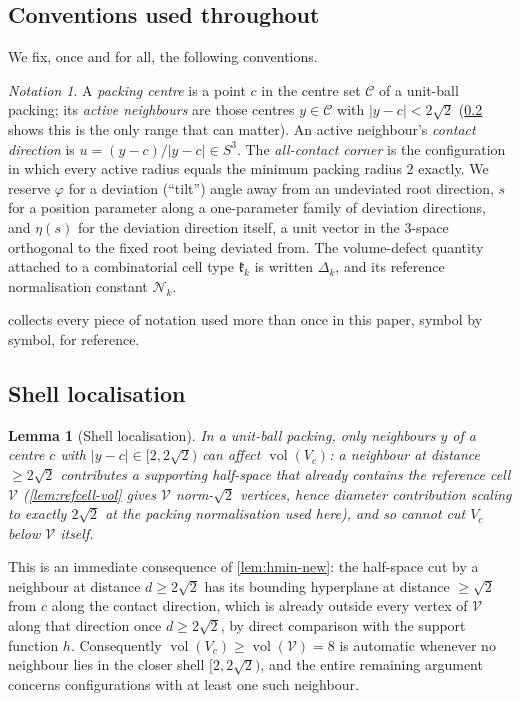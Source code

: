 \documentclass[11pt,reqno]{amsart}
\renewcommand{\_}{\origunderscore\allowbreak}
\numberwithin{equation}{section}
\theoremstyle{plain}
\newtheorem{lem}[thm]{Lemma}
\theoremstyle{definition}
\theoremstyle{remark}
\newtheorem{notation}[thm]{Notation}
\newcommand{\VCell}{\mathcal{V}}             %
\newcommand{\Cell}[1]{\mathfrak{k}_{#1}}     %
\newcommand{\tilt}{\varphi}                  %
\newcommand{\arcp}{s}                        %
\newcommand{\dev}{\eta}                      %
\newcommand{\defect}{\Delta}                 %
\newcommand{\norm}[1]{\mathcal{N}_{#1}}      %
\DeclareMathOperator{\vol}{vol}
\begin{document}
\subsection{Conventions used throughout}

We fix, once and for all, the following conventions.

\begin{notation}\label{not:conventions-new}
A \emph{packing centre} is a point $c$ in the centre set $\mathcal{C}$
of a unit-ball packing; its \emph{active neighbours} are those centres
$y\in\mathcal{C}$ with $|y-c|<2\sqrt2$ (\cref{sec:shell-new} shows this
is the only range that can matter). An active neighbour's \emph{contact
direction} is $u=(y-c)/|y-c|\in S^3$. The \emph{all-contact corner} is
the configuration in which every active radius equals the minimum
packing radius $2$ exactly. We reserve $\tilt$ for a deviation
(``tilt'') angle away from an undeviated root direction, $\arcp$ for a
position parameter along a one-parameter family of deviation
directions, and $\dev(\arcp)$ for the deviation direction itself, a
unit vector in the $3$-space orthogonal to the fixed root being
deviated from. The volume-defect quantity attached to a combinatorial
cell type $\Cell{k}$ is written $\defect_k$, and its reference
normalisation constant $\norm{k}$.
\end{notation}

 collects every piece of notation used more than
once in this paper, symbol by symbol, for reference.

\subsection{Shell localisation}\label{sec:shell-new}

\begin{lem}[Shell localisation]\label{lem:shell-new}
In a unit-ball packing, only neighbours $y$ of a centre $c$ with
$|y-c|\in[2,2\sqrt2)$ can affect $\vol(V_c)$: a neighbour at distance
$\ge2\sqrt2$ contributes a supporting half-space that already contains
the reference cell $\VCell$ (\cref{lem:refcell-vol} gives $\VCell$
norm-$\sqrt2$ vertices, hence diameter contribution scaling to exactly
$2\sqrt2$ at the packing normalisation used here), and so cannot cut
$V_c$ below $\VCell$ itself.
\end{lem}

This is an immediate consequence of \cref{lem:hmin-new}: the half-space
cut by a neighbour at distance $d\ge2\sqrt2$ has its bounding hyperplane
at distance $\ge\sqrt2$ from $c$ along the contact direction, which is
already outside every vertex of $\VCell$ along that direction once
$d\ge2\sqrt2$, by direct comparison with the support function $h$.
Consequently $\vol(V_c)\ge\vol(\VCell)=8$ is automatic whenever no
neighbour lies in the closer shell $[2,2\sqrt2)$, and the entire
remaining argument concerns configurations with at least one such
neighbour.
\end{document}
